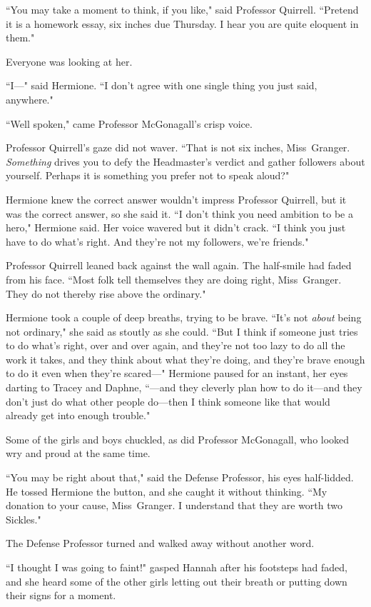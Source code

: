 ``You may take a moment to think, if you like," said Professor Quirrell. ``Pretend it is a homework essay, six inches due Thursday. I hear you are quite eloquent in them."

Everyone was looking at her.

``I—" said Hermione. ``I don't agree with one single thing you just said, anywhere."

``Well spoken," came Professor McGonagall's crisp voice.

Professor Quirrell's gaze did not waver. ``That is not six inches, Miss~Granger. \emph{Something} drives you to defy the Headmaster's verdict and gather followers about yourself. Perhaps it is something you prefer not to speak aloud?"

Hermione knew the correct answer wouldn't impress Professor Quirrell, but it was the correct answer, so she said it. ``I don't think you need ambition to be a hero," Hermione said. Her voice wavered but it didn't crack. ``I think you just have to do what's right. And they're not my followers, we're friends."

Professor Quirrell leaned back against the wall again. The half-smile had faded from his face. ``Most folk tell themselves they are doing right, Miss~Granger. They do not thereby rise above the ordinary."

Hermione took a couple of deep breaths, trying to be brave. ``It's not \emph{about} being not ordinary," she said as stoutly as she could. ``But I think if someone just tries to do what's right, over and over again, and they're not too lazy to do all the work it takes, and they think about what they're doing, and they're brave enough to do it even when they're scared—" Hermione paused for an instant, her eyes darting to Tracey and Daphne, ``—and they cleverly plan how to do it—and they don't just do what other people do—then I think someone like that would already get into enough trouble."

Some of the girls and boys chuckled, as did Professor McGonagall, who looked wry and proud at the same time.

``You may be right about that," said the Defense Professor, his eyes half-lidded. He tossed Hermione the button, and she caught it without thinking. ``My donation to your cause, Miss~Granger. I understand that they are worth two Sickles."

The Defense Professor turned and walked away without another word.

``I thought I was going to faint!" gasped Hannah after his footsteps had faded, and she heard some of the other girls letting out their breath or putting down their signs for a moment.

